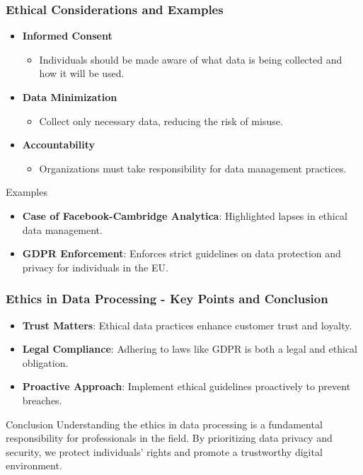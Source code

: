 \documentclass[aspectratio=169]{beamer}
\begin{document}
\begin{frame}[fragile]
    \frametitle{Ethical Considerations and Examples}
    \begin{itemize}
        \item \textbf{Informed Consent}
            \begin{itemize}
                \item Individuals should be made aware of what data is being collected and how it will be used.
            \end{itemize}
        \item \textbf{Data Minimization}
            \begin{itemize}
                \item Collect only necessary data, reducing the risk of misuse.
            \end{itemize}
        \item \textbf{Accountability}
            \begin{itemize}
                \item Organizations must take responsibility for data management practices.
            \end{itemize}
    \end{itemize}
    
    \begin{block}{Examples}
        \begin{itemize}
            \item \textbf{Case of Facebook-Cambridge Analytica}: Highlighted lapses in ethical data management.
            \item \textbf{GDPR Enforcement}: Enforces strict guidelines on data protection and privacy for individuals in the EU.
        \end{itemize}
    \end{block}
\end{frame}

\begin{frame}[fragile]
    \frametitle{Ethics in Data Processing - Key Points and Conclusion}
    \begin{itemize}
        \item \textbf{Trust Matters}: Ethical data practices enhance customer trust and loyalty.
        \item \textbf{Legal Compliance}: Adhering to laws like GDPR is both a legal and ethical obligation.
        \item \textbf{Proactive Approach}: Implement ethical guidelines proactively to prevent breaches.
    \end{itemize}
    
    \begin{block}{Conclusion}
        Understanding the ethics in data processing is a fundamental responsibility for professionals in the field. 
        By prioritizing data privacy and security, we protect individuals’ rights and promote a trustworthy digital environment.
    \end{block}
\end{frame}
\end{document}
